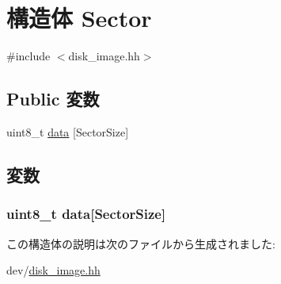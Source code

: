 \hypertarget{structCowDiskImage_1_1Sector}{
\section{構造体 Sector}
\label{structCowDiskImage_1_1Sector}
}


{\ttfamily \#include $<$disk\_\-image.hh$>$}\subsection*{Public 変数}
\begin{DoxyCompactItemize}
\item 
uint8\_\-t \hyperlink{structCowDiskImage_1_1Sector_abf5203048710bba5651484b294c8c345}{data} \mbox{[}SectorSize\mbox{]}
\end{DoxyCompactItemize}


\subsection{変数}
\hypertarget{structCowDiskImage_1_1Sector_abf5203048710bba5651484b294c8c345}{
\subsubsection[{data}]{\setlength{\rightskip}{0pt plus 5cm}uint8\_\-t {\bf data}\mbox{[}SectorSize\mbox{]}}}
\label{structCowDiskImage_1_1Sector_abf5203048710bba5651484b294c8c345}


この構造体の説明は次のファイルから生成されました:\begin{DoxyCompactItemize}
\item 
dev/\hyperlink{disk__image_8hh}{disk\_\-image.hh}\end{DoxyCompactItemize}
